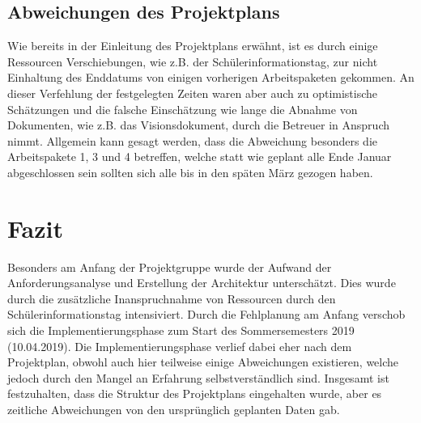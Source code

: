 \subsection{Abweichungen des Projektplans}
Wie bereits in der Einleitung des Projektplans erwähnt, ist es durch einige Ressourcen Verschiebungen, wie z.B. der Schülerinformationstag, zur nicht Einhaltung des Enddatums von einigen vorherigen Arbeitspaketen gekommen. An dieser Verfehlung der festgelegten Zeiten waren aber auch zu optimistische Schätzungen und die falsche Einschätzung wie lange die Abnahme von Dokumenten, wie z.B. das Visionsdokument, durch die Betreuer in Anspruch nimmt. Allgemein kann gesagt werden, dass die Abweichung besonders die Arbeitspakete 1, 3 und 4 betreffen, welche statt wie geplant alle Ende Januar abgeschlossen sein sollten sich alle bis in den späten März gezogen haben.

\section{Fazit}
Besonders am Anfang der Projektgruppe wurde der Aufwand der Anforderungsanalyse und Erstellung der Architektur unterschätzt. Dies wurde durch die zusätzliche Inanspruchnahme von Ressourcen durch den Schülerinformationstag intensiviert. Durch die Fehlplanung am Anfang verschob sich die Implementierungsphase zum Start des Sommersemesters 2019 (10.04.2019). Die Implementierungsphase verlief dabei eher nach dem Projektplan, obwohl auch hier teilweise einige Abweichungen existieren, welche jedoch durch den Mangel an Erfahrung selbstverständlich sind. Insgesamt ist festzuhalten, dass die Struktur des Projektplans eingehalten wurde, aber es zeitliche Abweichungen von den ursprünglich geplanten Daten gab.